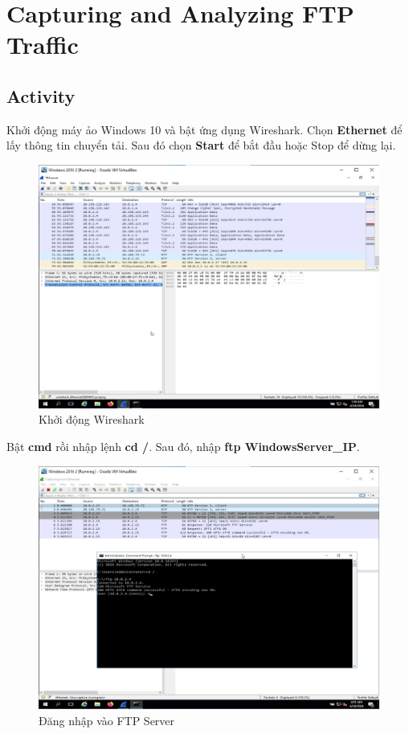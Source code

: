 
\newpage
\section{Capturing and Analyzing FTP Traffic}

\subsection{Activity}

 Khởi động máy ảo Windows 10 và bật ứng dụng Wireshark. Chọn \textbf{Ethernet} để lấy thông tin chuyển tải. Sau đó chọn \textbf{Start} để bắt đầu hoặc Stop để dừng lại.

\begin{figure}[!htb]
    \centering
    \includegraphics[width=0.75\linewidth]{figure//chapter9//lab9_3/wireshark.png}
    \caption{Khởi động Wireshark}
    \label{fig:enter-label}
\end{figure}



 Bật \textbf{cmd} rồi nhập lệnh \textbf{cd /}. Sau đó, nhập \textbf{ftp WindowsServer\_IP}.

\begin{figure}[!htb]
    \centering
    \includegraphics[width=0.75\linewidth]{figure//chapter9//lab9_3/login_ftp.png}
    \caption{Đăng nhập vào FTP Server}
    \label{fig:enter-label}
\end{figure}

